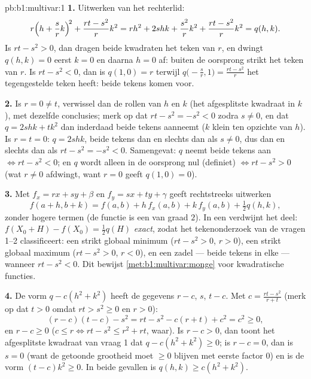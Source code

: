 \begin{solution}{pb:b1:multivar:1}
\textbf{1.} Uitwerken van het rechterlid:
\[
r\Bigl(h + \frac srk\Bigr)^{\!2} + \frac{rt - s^2}{r}k^2
= rh^2 + 2shk + \frac{s^2}{r}k^2 + \frac{rt - s^2}{r}k^2
= q(h,k) .
\]
Is $rt - s^2 > 0$, dan dragen beide kwadraten het teken van $r$,
en dwingt $q(h,k) = 0$ eerst $k = 0$ en daarna $h = 0$ af: buiten
de oorsprong strikt het teken van $r$. Is $rt - s^2 < 0$, dan is
$q(1, 0) = r$ terwijl $q\bigl(-\frac sr, 1\bigr) = \frac{rt -
s^2}{r}$ het tegengestelde teken heeft: beide tekens komen voor.

\textbf{2.} Is $r = 0 \neq t$, verwissel dan de rollen van $h$ en
$k$ (het afgesplitste kwadraat in $k$), met dezelfde conclusies;
merk op dat $rt - s^2 = -s^2 < 0$ zodra $s \neq 0$, en dat $q =
2shk + tk^2$ dan inderdaad beide tekens aanneemt ($k$ klein ten
opzichte van $h$). Is $r = t = 0$: $q = 2shk$, beide tekens dan en
slechts dan als $s \neq 0$, dus dan en slechts dan als $rt - s^2 =
-s^2 < 0$. Samengevat: $q$ neemt beide tekens aan $\iff rt - s^2 <
0$; en $q$ wordt alleen in de oorsprong nul (definiet) $\iff rt -
s^2 > 0$ (wat $r \neq 0$ afdwingt, want $r = 0$ geeft $q(1,0) =
0$).

\textbf{3.} Met $f_x = rx + sy + \beta$ en $f_y = sx + ty + \gamma$
geeft rechtstreeks uitwerken
\[
f(a + h, b + k) = f(a, b) + h\,f_x(a,b) + k\,f_y(a,b)
+ \tfrac12 q(h, k),
\]
zonder hogere termen (de functie is een  van graad $2$). In
een  verdwijnt het  deel: $f(X_0 + H) - f(X_0)
= \frac12 q(H)$ \emph{exact}, zodat het tekenonderzoek van de
vragen 1--2 classificeert: een strikt globaal minimum ($rt - s^2 >
0$, $r > 0$), een strikt globaal maximum ($rt - s^2 > 0$, $r < 0$),
en een zadel --- beide tekens in elke  --- wanneer $rt -
s^2 < 0$. Dit bewijst \cref{met:b1:multivar:monge} voor
kwadratische functies.

\textbf{4.} De vorm $q - c(h^2 + k^2)$ heeft de gegevens $r - c$,
$s$, $t - c$. Met $c = \frac{rt - s^2}{r + t}$ (merk op dat $t > 0$
omdat $rt > s^2 \geq 0$ en $r > 0$):
\[
(r - c)(t - c) - s^2 = rt - s^2 - c(r + t) + c^2 = c^2 \geq 0,
\]
en $r - c \geq 0$ ($c \leq r \iff rt - s^2 \leq r^2 + rt$, waar).
Is $r - c > 0$, dan toont het afgesplitste kwadraat van vraag 1 dat
$q - c(h^2 + k^2) \geq 0$; is $r - c = 0$, dan is $s = 0$ (want de
getoonde grootheid moet $\geq 0$ blijven met eerste factor $0$) en
is de vorm $(t - c)k^2 \geq 0$. In beide gevallen is $q(h,k) \geq
c(h^2 + k^2)$.


\end{solution}
